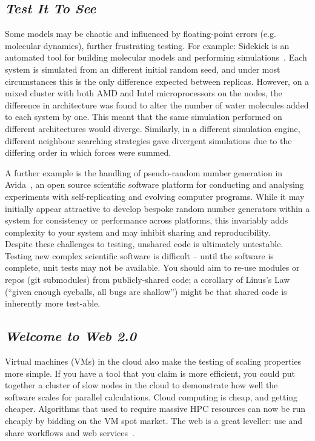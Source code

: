 \documentclass[a4paper,11pt]{article}
\begin{document}
\subsection{{\emph{Test It To See}}}

Some models may be chaotic and influenced by floating-point errors
(e.g. molecular dynamics), further frustrating testing. For example:
Sidekick is an automated tool for building molecular models and
performing simulations~\cite{Hall2014Sidekick}. Each system is
simulated from an different initial random seed, and under most
circumstances this is the only difference expected between
replicas. However, on a mixed cluster with both AMD and Intel
microprocessors on the nodes, the difference in architecture was found
to alter the number of water molecules added to each system by
one. This meant that the same simulation performed on different
architectures would diverge. Similarly, in a different simulation
engine, different neighbour searching strategies gave divergent
simulations due to the differing order in which forces were summed.

A further example is the handling of pseudo-random number generation
in Avida~\cite{ofria+wilke:2004}, an open source scientific software
platform for conducting and analysing experiments with
self-replicating and evolving computer programs. While it may
initially appear attractive to develop bespoke random number
generators within a system for consistency or performance across
platforms, this invariably adds complexity to your system and may
inhibit sharing and reproducibility.\\

 Despite these
challenges to testing, unshared code is ultimately untestable.
Testing new complex scientific software is difficult -- until the
software is complete, unit tests may not be available. You should aim
to re-use modules or repos (git submodules) from publicly-shared
code; a corollary of Linus's Law (``given enough eyeballs, all bugs
are shallow'') might be that shared code is inherently more test-able.


\subsection{{\emph{Welcome to Web 2.0}}}

Virtual machines (VMs) in the cloud also make the testing of scaling
properties more simple.  If you have a tool that you claim is more
efficient, you could put together a cluster of slow nodes in the cloud
to demonstrate how well the software scales for parallel calculations.
Cloud computing is cheap, and getting cheaper. Algorithms that used to
require massive HPC resources can now be run cheaply by bidding on the
VM spot market. The web is a great leveller: use and share workflows
and web services~\cite{crick-et-al:2009b,oabarriaga-et-al:2014}.\\
\end{document}
